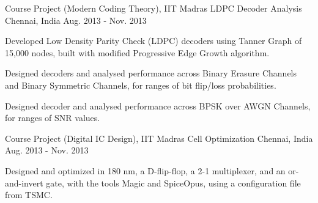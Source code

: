\begin{cventries}
	\cventry
	{Course Project (Modern Coding Theory), IIT Madras}
	{LDPC Decoder Analysis}
	{Chennai, India}
	{Aug. 2013 - Nov. 2013}
	{
		\begin{cvitems}
			\item{Developed Low Density Parity Check (LDPC) decoders using Tanner Graph of 15,000 nodes, built with modified Progressive Edge Growth algorithm.}
			\item{Designed decoders and analysed performance across Binary Erasure Channels and Binary Symmetric Channels, for ranges of bit flip/loss probabilities.}
			\item{Designed decoder and analysed performance across BPSK over AWGN Channels, for ranges of SNR values.}
		\end{cvitems}
	}

	\cventry
	{Course Project (Digital IC Design), IIT Madras}
	{Cell Optimization}
	{Chennai, India}
	{Aug. 2013 - Nov. 2013}
	{
		\begin{cvitems}
			\item{Designed and optimized in 180 nm, a D-flip-flop, a 2-1 multiplexer, and an or-and-invert gate, with the tools Magic and SpiceOpus, using a configuration file from TSMC.}
		\end{cvitems}
	}

\end{cventries}
